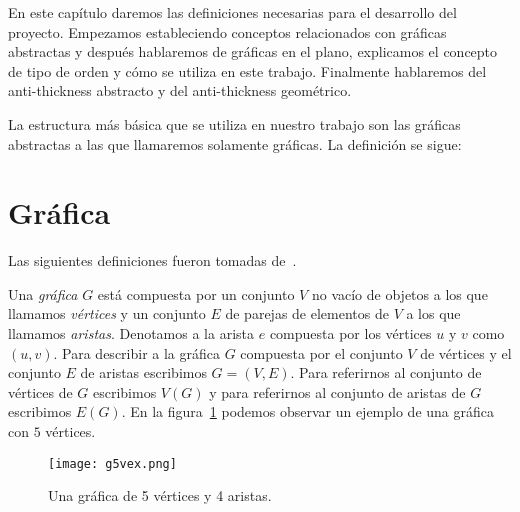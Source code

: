 En este capítulo daremos las definiciones necesarias para el desarrollo del proyecto.
Empezamos estableciendo conceptos relacionados con gráficas abstractas y después
hablaremos de gráficas en el plano, explicamos el concepto de tipo de orden y cómo
se utiliza en este trabajo. Finalmente hablaremos del anti-thickness abstracto
y del anti-thickness geométrico.

La estructura más básica que se utiliza en nuestro trabajo son las gráficas abstractas
a las que llamaremos solamente gráficas. La definición se sigue:
\section{Gráfica}
Las siguientes definiciones fueron tomadas de~\cite{Chartrand2008}.

Una \emph{gráfica} $G$ está compuesta por un conjunto $V$ no vacío de objetos a los que llamamos \emph{vértices}
y un conjunto $E$ de parejas de elementos de $V$ a los que llamamos \emph{aristas}. Denotamos
a la arista $e$ compuesta por los vértices $u$ y $v$ como $(u,v)$. Para describir a la gráfica $G$
compuesta por el conjunto $V$ de vértices y el conjunto $E$ de aristas escribimos $G=(V,E)$.
Para referirnos al conjunto de vértices de $G$ escribimos $V(G)$ y para referirnos
al conjunto de aristas de $G$ escribimos $E(G)$. En la figura~\ref{fig:g5vex} podemos observar
un ejemplo de una gráfica con $5$ vértices.

\begin{figure}[t]
  \centering
  \texttt{[image: g5vex.png]}
  \caption{Una gráfica de 5 vértices y 4 aristas.}
  \label{fig:g5vex}
\end{figure}


